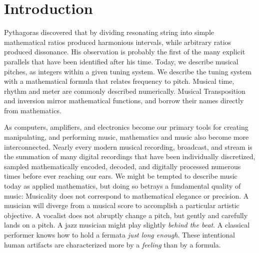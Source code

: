 \cleardoublepage
\chapter{Introduction}
\label{ch:introduction}
\begin{fullwidth}
   Pythagoras discovered that by
  dividing resonating string into simple mathematical ratios produced
  harmonious intervals, while arbitrary ratios produced dissonance.
  His observation is probably the first of the many explicit parallels
  that have been identified after his time. Today, we describe musical
  pitches, as integers within a given tuning system. We describe the
  tuning system with a mathematical formula that relates frequency to
  pitch. Musical time, rhythm and meter are commonly described
  numerically. Musical Transposition and inversion mirror mathematical
  functions, and borrow their names directly from mathematics. 
\end{fullwidth}

As computers, amplifiers, and electronics become our primary tools for
creating manipulating, and performing music, mathematics and music
also become more interconnected. Nearly every modern musical
recording, broadcast, and stream is the summation of many digital
recordings that have been individually discretized, sampled
mathematically encoded, decoded, and digitally processed numerous
times before ever reaching our ears. We might be tempted to describe
music today as applied mathematics, but doing so betrays a fundamental
quality of music: Musicality does not correspond to mathematical
elegance or precision. A musician will diverge from a musical score to
accomplish a particular artistic objective. A vocalist does not
abruptly change a pitch, but gently and carefully lands on a pitch. A
jazz musician might play slightly \emph{behind the beat}. A classical
performer knows how to hold a fermata \emph{just long enough}. These
intentional human artifacts are characterized more by a \emph{feeling}
than by a formula.


